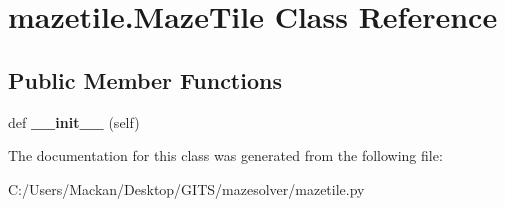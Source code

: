 \hypertarget{classmazetile_1_1_maze_tile}{}\section{mazetile.\+Maze\+Tile Class Reference}
\label{classmazetile_1_1_maze_tile}
\subsection*{Public Member Functions}
\begin{DoxyCompactItemize}
\item 
\mbox{\label{classmazetile_1_1_maze_tile_acb60bea3e9ac5336d54999f84c50c2c6}} 
def {\bfseries \+\_\+\+\_\+init\+\_\+\+\_\+} (self)
\end{DoxyCompactItemize}


The documentation for this class was generated from the following file\+:\begin{DoxyCompactItemize}
\item 
C\+:/\+Users/\+Mackan/\+Desktop/\+G\+I\+T\+S/mazesolver/mazetile.\+py\end{DoxyCompactItemize}
